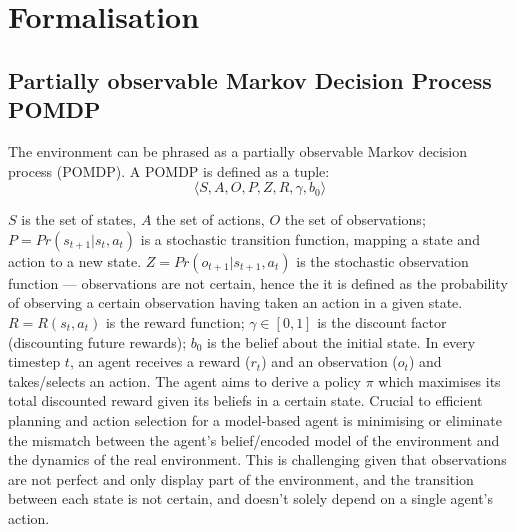 \section{Formalisation} \label{MDP/POMDP}
\subsection{Partially observable Markov Decision Process POMDP}
The environment can be phrased as a partially observable Markov decision process (POMDP). 
A POMDP is defined as a tuple: 
\begin{equation}
    \langle S, A, O, P, Z, R, \gamma, b_0 \rangle
\end{equation}

\noindent$S$ is the set of states, $A$ the set of actions, $O$ the set of observations; 
\newline \newline  
$P = Pr(s_{t+1}|s_t, a_t)$ is a stochastic transition function, mapping a state and action to a new state. \newline \newline 
 $Z = Pr(o_{t+1}|s_{t+1},a_{t})$ is the stochastic observation function --- observations are not certain, hence the it is defined as the probability of observing a certain observation having taken an action in a given state. 
 \newline \newline
 $R = R(s_t, a_t)$ is the reward function;
 \newline \newline
 $\gamma \in [0,1]$ is the discount factor (discounting future rewards);
 \newline \newline 
 $b_0$ is the belief about the initial state.
\newline \newline 
In every timestep $t$, an agent receives a reward ($r_t$) and an observation ($o_t$) and takes/selects an action. The agent aims to derive a policy $\pi$ which maximises its total discounted reward given its beliefs in a certain state. 
\newline \newline
Crucial to efficient planning and action selection for a model-based agent is minimising or eliminate the mismatch between the agent's belief/encoded model of the environment and the dynamics of the real environment. This is challenging given that observations are not perfect and only display part of the environment, and the transition between each state is not certain, and doesn't solely depend on a single agent's action.
